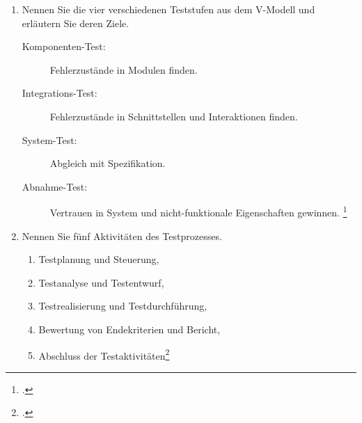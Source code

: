 \documentclass{bschlangaul-aufgabe}
\begin{document}
\begin{enumerate}

\item Nennen Sie die vier verschiedenen Teststufen aus dem
V-Modell und erläutern Sie deren Ziele.

\begin{bAntwort}
\begin{description}
\item[Komponenten-Test:]
Fehlerzustände in Modulen finden.

\item[Integrations-Test:]
Fehlerzustände in Schnittstellen und Interaktionen finden.

\item[System-Test:]
Abgleich mit Spezifikation.

\item[Abnahme-Test:]
Vertrauen in System und nicht-funktionale Eigenschaften gewinnen.
\footcite[Seite 50, Abbildung 3.2]{schatten}
\end{description}
\end{bAntwort}


\item Nennen Sie fünf Aktivitäten des Testprozesses.

\begin{bAntwort}
\begin{enumerate}
\item Testplanung und Steuerung,

\item Testanalyse und Testentwurf,

\item Testrealisierung und Testdurchführung,

\item Bewertung von Endekriterien und Bericht,

\item Abschluss der Testaktivitäten\footcite[Kapitel „5.6.2 Der
traditionelle Testprozess“ Seite 135-138]{schatten}
\end{enumerate}
\end{bAntwort}

\end{enumerate}
\end{document}
